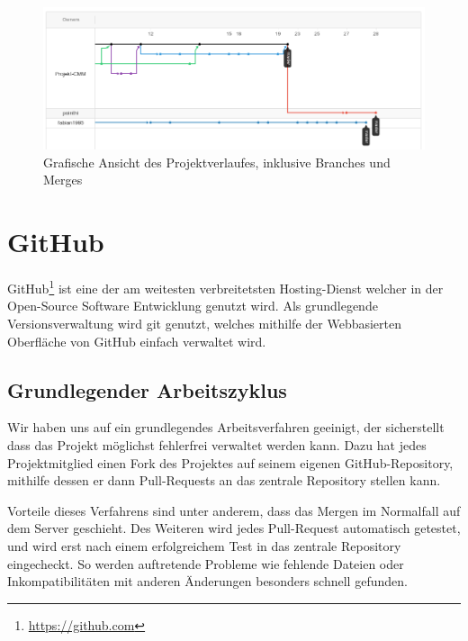\begin{figure}[h]
\centering
\includegraphics[width=1\textwidth]{./media/images/development/git_history.png}
\caption{Grafische Ansicht des Projektverlaufes, inklusive Branches und  Merges}
\label{development_git_history}
\end{figure}

\section{GitHub}

GitHub\footnote{\url{https://github.com}} ist eine der am weitesten verbreitetsten Hosting-Dienst welcher in der Open-Source Software Entwicklung genutzt wird. Als grundlegende Versionsverwaltung wird git genutzt, welches mithilfe der Webbasierten Oberfl\"ache von GitHub einfach verwaltet wird.

\subsection{Grundlegender Arbeitszyklus}

Wir haben uns auf ein grundlegendes Arbeitsverfahren geeinigt, der sicherstellt dass das Projekt m\"oglichst fehlerfrei verwaltet werden kann. Dazu hat jedes Projektmitglied einen Fork des Projektes auf seinem eigenen GitHub-Repository, mithilfe dessen er dann Pull-Requests an das zentrale Repository stellen kann.

Vorteile dieses Verfahrens sind unter anderem, dass das Mergen im Normalfall auf dem Server geschieht. Des Weiteren wird jedes Pull-Request automatisch getestet, und wird erst nach einem erfolgreichem Test in das zentrale Repository eingecheckt. So werden auftretende Probleme wie fehlende Dateien oder Inkompatibilit\"aten mit anderen \"Anderungen besonders schnell gefunden.